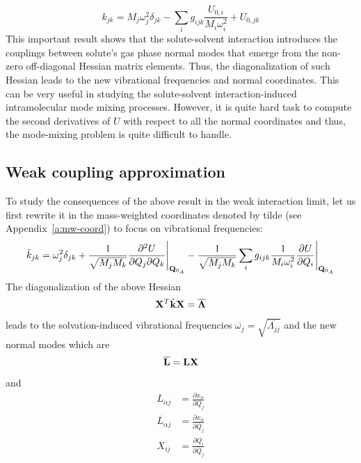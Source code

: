 \documentclass[a4paper,titlepage,twoside,fleqn,12pt]{book}
\newcommand{\BM}[1]{\bm{#1}}
\newcommand{\fderiv}[2]{\ensuremath{
\frac{\partial #1}{\partial #2}}}
\newcommand{\sderivd}[3]{\ensuremath{
\frac{\partial^2 #1}{\partial #2 \partial #3}
}}
\begin{document}
\begin{refsection}
\begin{equation}
\boxed{
 k_{jk} = M_j \omega_j^2 \delta_{jk} - \sum_i g_{ijk} \frac{U_{0,i}}{M_i\omega_i^2} + U_{0,jk}
}
\end{equation}
%
This important result shows that the solute\hyp{}solvent interaction
introduces the couplings between solute's gas phase
normal modes that emerge from the non\hyp{}zero off\hyp{}diagonal
Hessian matrix elements. Thus, the diagonalization of such
Hessian leads to the new vibrational frequencies and normal
coordinates. This can be very useful in studying the solute\hyp{}solvent 
interaction\hyp{}induced intramolecular mode
mixing processes. However, it is quite hard task to 
compute the second derivatives of $U$
with respect to all the normal coordinates and thus, the mode\hyp{}mixing
problem is quite difficult to handle. 

\subsection{Weak coupling approximation}

To study the consequences of the above result in the weak interaction
limit, let us first rewrite it
in the mass\hyp{}weighted
coordinates denoted by tilde (see Appendix~\ref{a:mw-coord}) to focus on vibrational
frequencies:
%
\begin{equation} 
 \tilde{k}_{jk} = \omega_j^2 \delta_{jk} + \frac{1}{\sqrt{M_jM_k}}\sderivd{U}{Q_j}{Q_k}  \Bigg|_{{\bf Q}_{0_A}} 
                           - \frac{1}{\sqrt{M_jM_k}}\sum_i g_{ijk} 
                             \frac{1}{M_i\omega_i^2}\fderiv{U}{Q_i}          \Bigg|_{{\bf Q}_{0_A}}        
\end{equation}
%
The diagonalization of the above Hessian
%
\begin{equation} 
 {\bf X}^T \tilde{\bf k} {\bf X} = \overline{\BM\Lambda}
\end{equation}
%
leads to the solvation\hyp{}induced vibrational frequencies
$\overline{\omega_j}=\sqrt{\overline{\Lambda_{jj}}}$ 
and the new normal modes which are
%
\begin{equation} 
 \overline{\bf L}  = {\bf L} {\bf X}
\end{equation}
%
and
%
\begin{subequations} 
 \begin{align}
            {L}_{\alpha j}  &= \fderiv{x_\alpha}{         {Q}_j} \\
   \overline{L}_{\alpha j}  &= \fderiv{x_\alpha}{\overline{Q}_j} \\
                  X_{ij}    &= \fderiv{Q_i}{\overline{Q}_j}
 \end{align}
\end{subequations}
%


\end{refsection}
\end{document}
